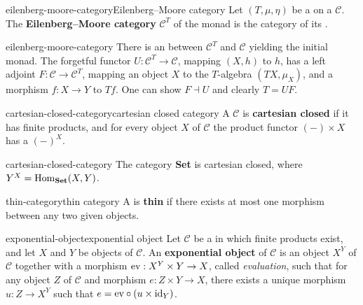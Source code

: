 \begin{topic}{eilenberg-moore-category}{Eilenberg--Moore category}
    Let $(T, \mu, \eta)$ be a  on a  $\mathcal{C}$. The \textbf{Eilenberg--Moore category} $\mathcal{C}^T$ of the monad is the category of its .
\end{topic}

\begin{example}{eilenberg-moore-category}
    There is an  between $\mathcal{C}^T$ and $\mathcal{C}$ yielding the initial monad. The forgetful functor $U : \mathcal{C}^T \to \mathcal{C}$, mapping $(X, h)$ to $h$, has a left adjoint $F : \mathcal{C} \to \mathcal{C}^T$, mapping an object $X$ to the $T$-algebra $(TX, \mu_X)$, and a morphism $f : X \to Y$ to $Tf$. One can show $F \dashv U$ and clearly $T = UF$.
\end{example}

\begin{topic}{cartesian-closed-category}{cartesian closed category}
    A  $\mathcal{C}$ is \textbf{cartesian closed} if it has finite products, and for every object $X$ of $\mathcal{C}$ the product functor $(-) \times X$ has a  $(-)^X$.
\end{topic}

\begin{example}{cartesian-closed-category}
    The category \textbf{Set} is cartesian closed, where $Y^X = \operatorname{Hom}_\textbf{Set}(X, Y)$.
\end{example}

\begin{topic}{thin-category}{thin category}
    A  is \textbf{thin} if there exists at most one morphism between any two given objects.
\end{topic}

\begin{topic}{exponential-object}{exponential object}
    Let $\mathcal{C}$ be a  in which finite products exist, and let $X$ and $Y$ be objects of $\mathcal{C}$. An \textbf{exponential object} of $\mathcal{C}$ is an object $X^Y$ of $\mathcal{C}$ together with a morphism $\textup{ev} : X^Y \times Y \to X$, called \textit{evaluation}, such that for any object $Z$ of $\mathcal{C}$ and morphism $e : Z \times Y \to X$, there exists a unique morphism $u : Z \to X^Y$ such that $e = \textup{ev} \circ (u \times \textup{id}_Y)$.
\end{topic}

